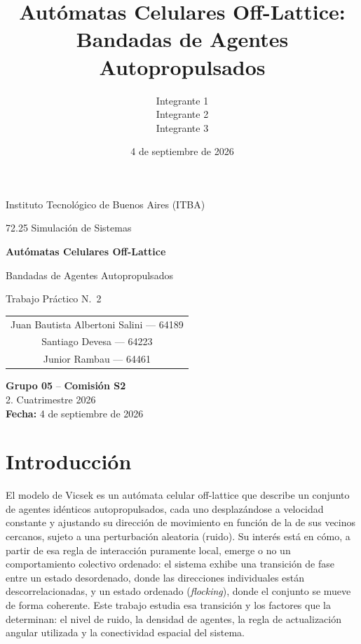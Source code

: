 \documentclass[11pt,a4paper]{article}
\title{Autómatas Celulares Off-Lattice: Bandadas de Agentes Autopropulsados}
\author{Integrante 1 \\ Integrante 2 \\ Integrante 3}
\date{4 de septiembre de 2026}
\begin{document}
\begin{titlepage}
  \centering
  \vspace*{1.5cm}
  {\large Instituto Tecnológico de Buenos Aires (ITBA)\par}
  \vspace{0.3cm}
  {\large 72.25 Simulación de Sistemas\par}

  \vspace{3.5cm}
  {\Huge\bfseries Autómatas Celulares Off-Lattice\par}
  \vspace{0.4cm}
  {\LARGE Bandadas de Agentes Autopropulsados\par}
  \vspace{0.6cm}
  {\large Trabajo Práctico N.\textdegree{}~2\par}

  \vspace{3.5cm}
  {\large
    \begin{tabular}{c}
      Juan Bautista Albertoni Salini — 64189 \\
      Santiago Devesa — 64223  \\
      Junior Rambau — 64461
    \end{tabular}
  \par}

  \vfill
  {\large
    \textbf{Grupo 05} -- \textbf{Comisión S2}\\
    2.\textdegree{} Cuatrimestre 2026\\
    \textbf{Fecha:} 4 de septiembre de 2026
  \par}
  \vspace{1.5cm}
\end{titlepage}

\tableofcontents
\newpage

\section{Introducción}

El modelo de Vicsek \cite{vicsek1995} es un autómata celular off-lattice que
describe un conjunto de agentes idénticos autopropulsados, cada uno
desplazándose a velocidad constante y ajustando su dirección de movimiento
en función de la de sus vecinos cercanos, sujeto a una perturbación
aleatoria (ruido). Su interés está en cómo, a partir de esa regla de
interacción puramente local, emerge o no un comportamiento colectivo
ordenado: el sistema exhibe una transición de fase entre un estado
desordenado, donde las direcciones individuales están descorrelacionadas, y
un estado ordenado (\emph{flocking}), donde el conjunto se mueve de forma
coherente. Este trabajo estudia esa transición y los factores que la
determinan: el nivel de ruido, la densidad de agentes, la regla de
actualización angular utilizada y la conectividad espacial del sistema.
\end{document}
